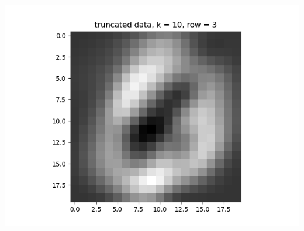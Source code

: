 \documentclass{article}
\begin{document}
\begin{enumerate}
\begin{enumerate}
\begin{center}
			\includegraphics[scale=.4]{hw3 trunc, k = 10, row = 3}
			

\end{center}
\end{enumerate}
\end{enumerate}
\end{document}
